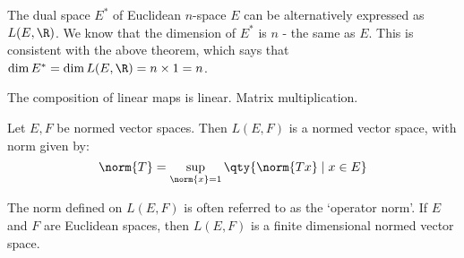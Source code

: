  The dual space \( E^* \) of Euclidean \( n \)-space \( E \) can be alternatively expressed as \( L(E,\R) \). We know that the dimension of \( E^* \) is \( n \) - the same as \( E \). This is consistent with the above theorem, which says that \( \dim E^*=\dim L(E,\R)=n\times 1=n \).

 \vspace{3mm}

 The composition of linear maps is linear. Matrix multiplication.

 \begin{theorem}
   Let \( E,F \) be normed vector spaces. Then \( L(E,F) \) is a normed vector space, with norm given by:
   \[ \norm{T}=\sup_{\norm{x}=1}\qty{\norm{Tx}\mid x\in E} \]
 \end{theorem}

 The norm defined on \( L(E,F) \) is often referred to as the `operator norm'. If \( E \) and \( F \) are Euclidean spaces, then \( L(E,F) \) is a finite dimensional normed vector space.


